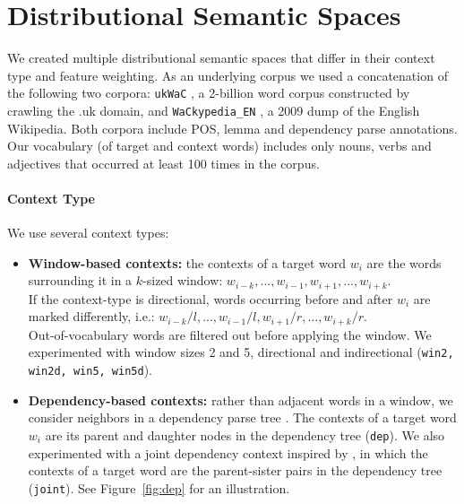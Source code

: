 \documentclass[11pt]{article}
\newcommand\smalltt[1]{\texttt{\small #1}}
\begin{document}
\section{Distributional Semantic Spaces}
\label{sec:dsm}

We created multiple distributional semantic spaces that differ in their context type and feature weighting. 
As an underlying corpus we used a concatenation of the following two corpora: \smalltt{ukWaC} \cite{ferraresi2007building}, a 2-billion word corpus constructed by crawling the .uk domain, and \smalltt{WaCkypedia\_EN} \cite{baroni2009wacky}, a 2009 dump of the English Wikipedia. Both corpora include POS, lemma and dependency parse annotations. Our vocabulary (of target and context words) includes only nouns, verbs and adjectives that occurred at least 100 times in the corpus.


\paragraph{Context Type} We use several context types: 

\begin{itemize}[leftmargin=*]

\vspace*{-2pt}
\item \textbf{Window-based contexts:} the contexts of a target word $w_i$ are the words surrounding it in a $k$-sized window: $w_{i-k}, ..., w_{i-1}, w_{i+1}, ..., w_{i+k}.$\\If the context-type is directional, words occurring before and after $w_i$ are marked differently, i.e.: $w_{i-k}/l, ..., w_{i-1}/l, w_{i+1}/r, ..., w_{i+k}/r$.\\Out-of-vocabulary words are filtered out before applying the window. We experimented with window sizes 2 and 5, directional and indirectional (\smalltt{win2, win2d, win5, win5d}). 

\vspace*{-2pt}
\item \textbf{Dependency-based contexts:} rather than adjacent words in a window, we consider neighbors in a dependency parse tree \cite{pado2007dependency,baroni2010distributional}. The contexts of a target word $w_i$ are its parent and daughter nodes in the dependency tree (\smalltt{dep}). We also experimented with a joint dependency context inspired by , in which the contexts of a target word are the parent-sister pairs in the dependency tree (\smalltt{joint}). See Figure~\ref{fig:dep} for an illustration. 
\end{itemize}
\vspace*{-2pt}
\end{document}
